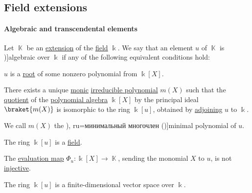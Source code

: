 \subsection{Field extensions}\label{subsec:field_extensions}

\paragraph{Algebraic and transcendental elements}

\begin{definition}\label{def:algebraic_element}
  Let \( \BbbK \) be an \hyperref[def:field/submodel]{extension} of the \hyperref[def:field]{field} \( \Bbbk \). We say that an element \( u \) of \( \BbbK \) is \term[ru=алгебрический (елемент) (\cite[407]{Винберг2014})]{algebraic} over \( \Bbbk \) if any of the following equivalent conditions hold:
  \begin{thmenum}
     \( u \) is a \hyperref[def:polynomial_root]{root} of some nonzero polynomial from \( \Bbbk[X] \).

     There exists a unique \hyperref[def:monic_polynomial]{monic} \hyperref[def:domain_divisibility/irreducible]{irreducible polynomial} \( m(X) \) such that the \hyperref[def:algebra_over_ring/quotient]{quotient} of the \hyperref[def:polynomial_algebra]{polynomial algebra} \( \Bbbk[X] \) by the principal ideal \( \braket{ m(X) } \) is isomorphic to the ring \( \Bbbk[u] \), obtained by \hyperref[def:semiring_adjunction]{adjoining} \( u \) to \( \Bbbk \).

    We call \( m(X) \) the \term[bg=минимален полином (\cite[def. VI.2]{ГеновМиховскиМоллов1991}), ru=минимальный многочлен (\cite[410]{Винберг2014})]{minimal polynomial} of \( u \).

     The ring \( \Bbbk[u] \) is a \hyperref[def:field]{field}.

     The \hyperref[rem:substitution_homomorphism]{evaluation map} \( \Phi_u: \Bbbk[X] \to \BbbK \), sending the monomial \( X \) to \( u \), is not \hyperref[def:function_invertibility/injective]{injective}.

     The ring \( \Bbbk[u] \) is a finite-dimensional vector space over \( \Bbbk \).
  \end{thmenum}
\end{definition}
